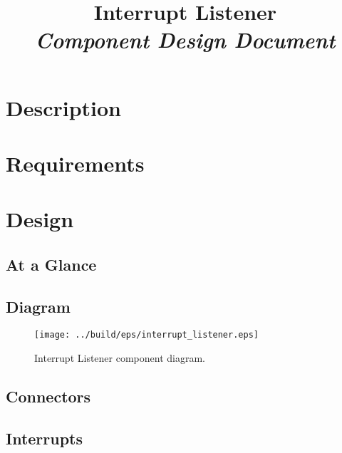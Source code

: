 



\title{\textbf{Interrupt Listener} \\
\large\textit{Component Design Document}}
\date{}
\maketitle

\section{Description}


\section{Requirements}


\section{Design}

\subsection{At a Glance}


\subsection{Diagram}
\begin{figure}[H]
  \texttt{[image: ../build/eps/interrupt\_listener.eps]}
  \caption{Interrupt Listener component diagram.}
\end{figure}



\subsection{Connectors}


\subsection{Interrupts}




